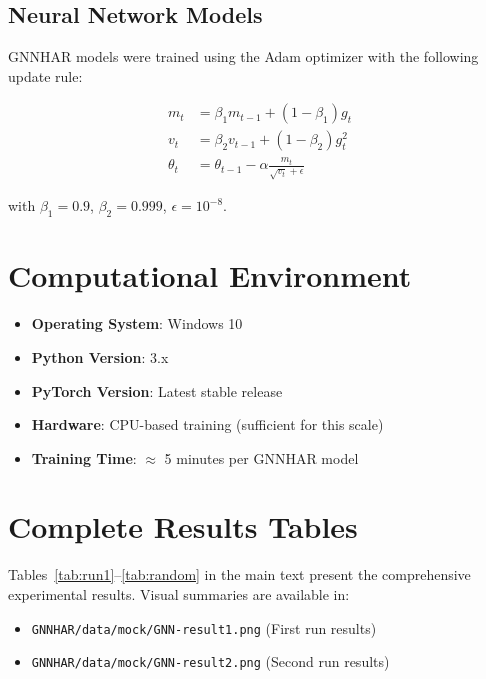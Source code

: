 \documentclass[10pt,a4paper]{article}
\begin{document}
\subsection{Neural Network Models}

GNNHAR models were trained using the Adam optimizer with the following update rule:

\begin{align}
m_t &= \beta_1 m_{t-1} + (1-\beta_1) g_t\\
v_t &= \beta_2 v_{t-1} + (1-\beta_2) g_t^2\\
\theta_t &= \theta_{t-1} - \alpha \frac{m_t}{\sqrt{v_t} + \epsilon}
\end{align}

with $\beta_1 = 0.9$, $\beta_2 = 0.999$, $\epsilon = 10^{-8}$.

\section{Computational Environment}

\begin{itemize}
\item \textbf{Operating System}: Windows 10
\item \textbf{Python Version}: 3.x
\item \textbf{PyTorch Version}: Latest stable release
\item \textbf{Hardware}: CPU-based training (sufficient for this scale)
\item \textbf{Training Time}: $\approx$ 5 minutes per GNNHAR model
\end{itemize}

\section{Complete Results Tables}

Tables~\ref{tab:run1}--\ref{tab:random} in the main text present the comprehensive experimental results. Visual summaries are available in:

\begin{itemize}
\item \texttt{GNNHAR/data/mock/GNN-result1.png} (First run results)
\item \texttt{GNNHAR/data/mock/GNN-result2.png} (Second run results)
\end{itemize}
\end{document}
